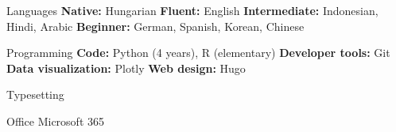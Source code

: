 
\begin{cvskills}
   
  \cvskill
    {Languages}
    {\textbf{Native:} Hungarian \textbf{Fluent:} English \textbf{Intermediate:} Indonesian, Hindi, Arabic \textbf{Beginner:} German, Spanish, Korean, Chinese} %
    
  \cvskill
    {Programming}
    {\textbf{Code:} Python (4 years), R (elementary) \textbf{Developer tools:} Git \textbf{Data visualization:} Plotly \textbf{Web design:} Hugo} %

  \cvskill
    {Typesetting}
    {\textrm{}}

  \cvskill
    {Office}
    {Microsoft 365}
 
\end{cvskills}

